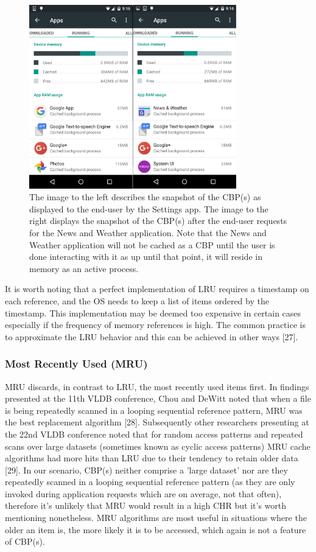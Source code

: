 \documentclass[12pt]{uthesis-v12}  %
\begin{document}
				\begin{figure}[!ht]
					\centering
					\includegraphics[width = 90mm]{images/beforeAndAfterNews.png}
					\caption[Before \& After News App Launch]
					{The image to the left describes the snapshot of the CBP(s) as displayed to the end-user by the Settings app. The image to the right displays the snapshot of the CBP(s) after the end-user requests for the News and Weather application. Note that the News and Weather application will not be cached as a CBP until the user is done interacting with it as up until that point, it will reside in memory as an active process.}
				\end{figure}				
				
				It is worth noting that a perfect implementation of LRU requires a timestamp on each reference, and the OS needs to keep a list of items ordered by the timestamp. This implementation may be deemed too expensive in certain cases especially if the frequency of memory references is high. The common practice is to approximate the LRU behavior and this can be achieved in other ways [27].
				 
			\subsubsection{Most Recently Used (MRU)}
				MRU discards, in contrast to LRU, the most recently used items first. In findings presented at the 11th VLDB conference, Chou and DeWitt noted that when a file is being repeatedly scanned in a looping sequential reference pattern, MRU was the best replacement algorithm [28]. Subsequently other researchers presenting at the 22nd VLDB conference noted that for random access patterns and repeated scans over large datasets (sometimes known as cyclic access patterns) MRU cache algorithms had more hits than LRU due to their tendency to retain older data [29]. In our scenario, CBP(s) neither comprise a 'large dataset' nor are they repeatedly scanned in a looping sequential reference pattern (as they are only invoked during application requests which are on average, not that often), therefore it's unlikely that MRU would result in a high CHR but it's worth mentioning nonetheless. MRU algorithms are most useful in situations where the older an item is, the more likely it is to be accessed, which again is not a feature of CBP(s).			
			
\end{document}
